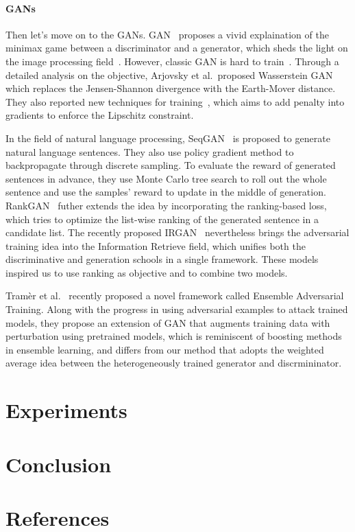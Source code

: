 \documentclass[twocolumn,a4paper,10pt,review,3p]{elsarticle}
\begin{document}
\paragraph{GANs} Then let's move on to the GANs. GAN~\cite{GAN} proposes a vivid explaination of the minimax game between a discriminator and a generator, which sheds the light on the image processing field~\cite{Ledig_2017_CVPR}. However, classic GAN is hard to train~\cite{Salimans_2016}. Through a detailed analysis on the objective, Arjovsky et al.\ proposed Wasserstein GAN~\cite{Arjovsky2017WGAN} which replaces the Jensen-Shannon divergence with the Earth-Mover distance. They also reported new techniques for training~\cite{Gulrajani2017LipschitzReg}, which aims to add penalty into gradients to enforce the Lipschitz constraint.

In the field of natural language processing, SeqGAN~\cite{SeqGAN} is proposed to generate natural language sentences. They also use policy gradient method to backpropagate through discrete sampling. To evaluate the reward of generated sentences in advance, they use Monte Carlo tree search to roll out the whole sentence and use the samples' reward to update in the middle of generation. RankGAN~\cite{RankGAN} futher extends the idea by incorporating the ranking-based loss, which tries to optimize the list-wise ranking of the generated sentence in a candidate list. The recently proposed IRGAN~\cite{IRGAN} nevertheless brings the adversarial training idea into the Information Retrieve field, which unifies both the discriminative and generation schools in a single framework. These models inspired us to use ranking as objective and to combine two models.

Tramèr et al.~\cite{EnsembleAdvTraining} recently proposed a novel framework called Ensemble Adversarial Training. Along with the progress in using adversarial examples to attack trained models, they propose an extension of GAN that augments training data with perturbation using pretrained models, which is reminiscent of boosting methods in ensemble learning, and differs from our method that adopts the weighted average idea between the heterogeneously trained generator and discrmininator.



\section{Experiments}


\section{Conclusion}

\section*{References}


\end{document}
